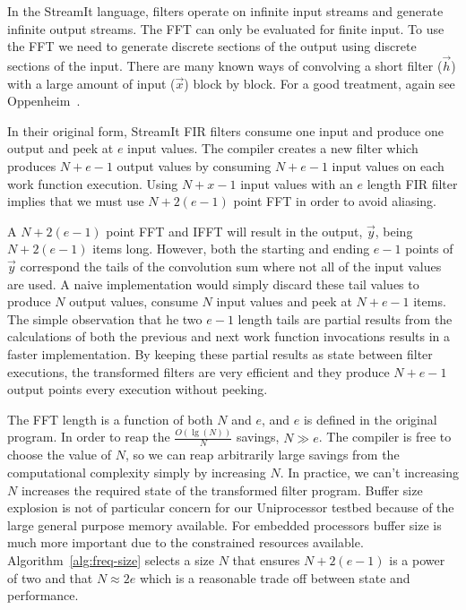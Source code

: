 In the StreamIt language, filters operate on infinite input streams 
and generate infinite output streams.
The FFT can only be evaluated for finite input. To use the FFT we need to
generate discrete sections of the output using discrete sections of the input.
There are many known ways of convolving a short filter ($\vec{h}$) with
a large amount of input ($\vec{x}$) block by block.
For a good treatment, again see Oppenheim~\cite{oppenheim-discrete}. 

In their original form, StreamIt FIR filters consume one input and 
produce one output and peek at $e$ input values. The compiler creates 
a new filter which produces $N+e-1$ output values by consuming $N+e-1$ input 
values on each work function execution. 
Using $N+x-1$ input values with an $e$ length FIR filter implies that we
must use $N+2(e-1)$ point FFT in order to avoid aliasing.

A $N+2(e-1)$ point FFT and IFFT will result in the output, $\vec{y}$, being $N+2(e-1)$
items long. However, both the starting and ending $e-1$ points of $\vec{y}$ correspond
the tails of the convolution sum where not all of the input values are used. 
A naive implementation would simply discard these tail values to produce 
$N$ output values, consume $N$ input values and peek at $N+e-1$ items.
The simple observation that he two $e-1$ length tails are partial results from the 
calculations of both the previous and next work function invocations results in 
a faster implementation. By keeping these partial results as state between
filter executions, the transformed filters are very efficient and they 
produce $N+e-1$ output points every execution without peeking.

The FFT length is a function of both $N$ and $e$, and $e$ is defined in the
original program. In order to reap the $\frac{O(\lg(N))}{N}$ savings, 
$N \gg e$. The compiler is free to choose the value of $N$, 
so we can reap arbitrarily large savings from the computational complexity 
simply by increasing $N$. 
In practice, we can't increasing $N$ increases the required state
of the transformed filter program. Buffer size explosion is
not of particular concern for our Uniprocessor testbed because of the large
general purpose memory available. For embedded processors 
buffer size is much more important due to the constrained resources available.
Algorithm~\ref{alg:freq-size} selects a size $N$ that ensures 
$N+2(e-1)$ is a power of two and that $N \approx 2e$ which is a 
reasonable trade off between state and performance.

